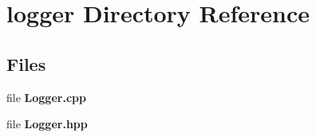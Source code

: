 \section{logger Directory Reference}
\label{dir_e546037d539dab48998ac54ab76cb525}
\subsection*{Files}
\begin{DoxyCompactItemize}
\item 
file \textbf{ Logger.\+cpp}
\item 
file \textbf{ Logger.\+hpp}
\end{DoxyCompactItemize}

